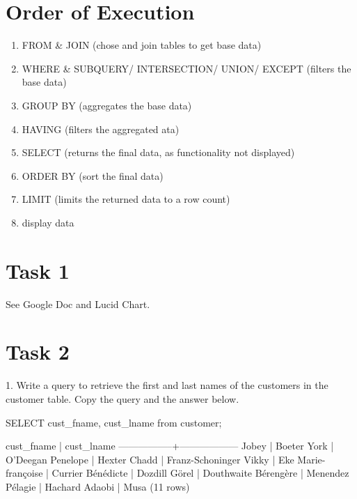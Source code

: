 
\section*{Order of Execution}
\begin{enumerate}
    \item FROM \& JOIN (chose and join tables to get base data)
    \item WHERE \& SUBQUERY/ INTERSECTION/ UNION/ EXCEPT (filters the base data)
    \item GROUP BY (aggregates the base data)
    \item HAVING (filters the aggregated ata)
    \item SELECT (returns the final data, as functionality not displayed)
    \item ORDER BY (sort the final data)
    \item LIMIT (limits the returned data to a row count)
    \item display data
\end{enumerate}

\section*{Task 1}
See Google Doc and Lucid Chart.

\section*{Task 2}
1. Write a query to retrieve the first and last names of the customers in the customer table. Copy the query and the answer below.
\begin{sql}
SELECT cust_fname, cust_lname from customer;
\end{sql}
\begin{pseudo*}
   cust_fname    |    cust_lname    
-----------------+------------------
 Jobey           | Boeter
 York            | O'Deegan
 Penelope        | Hexter
 Chadd           | Franz-Schoninger
 Vikky           | Eke
 Marie-françoise | Currier
 Bénédicte       | Dozdill
 Görel           | Douthwaite
 Bérengère       | Menendez
 Pélagie         | Hachard
 Adaobi          | Musa
(11 rows)
\end{pseudo*}

